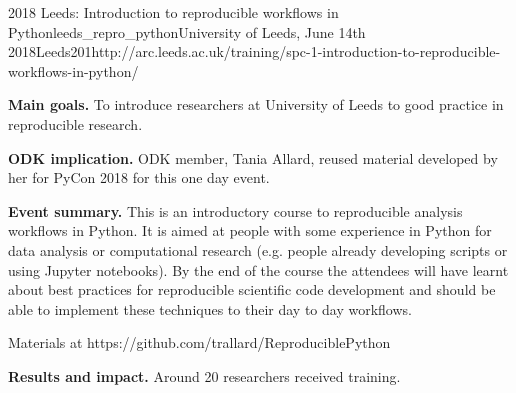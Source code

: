 \begin{event}{2018 Leeds: Introduction to reproducible workflows in Python}{leeds_repro_python}{University of Leeds, June 14th 2018}{Leeds}{20}{1}{http://arc.leeds.ac.uk/training/spc-1-introduction-to-reproducible-workflows-in-python/}

\textbf{Main goals.} To introduce researchers at University of Leeds to good practice in reproducible research.

\textbf{ODK implication.} ODK member, Tania Allard, reused material developed by her for PyCon 2018 for this one day event.

\textbf{Event summary.} This is an introductory course to reproducible analysis workflows in Python. It is aimed at people with some experience in Python for data analysis or computational research (e.g. people already developing scripts or using Jupyter notebooks). By the end of the course the attendees will have learnt about best practices for reproducible scientific code development and should be able to implement these techniques to their day to day workflows.

Materials at https://github.com/trallard/ReproduciblePython

\textbf{Results and impact.} Around 20 researchers received training.

\end{event}
